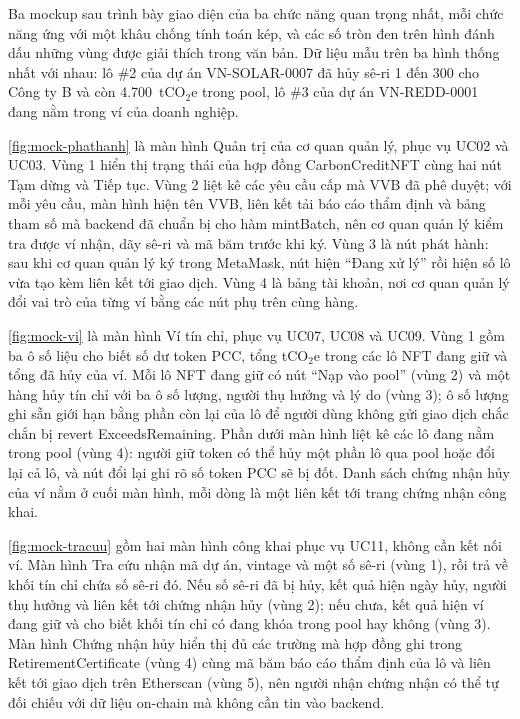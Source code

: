 Ba mockup sau trình bày giao diện của ba chức năng quan trọng nhất, mỗi chức năng ứng với một khâu chống tính toán kép, và các số tròn đen trên hình đánh dấu những vùng được giải thích trong văn bản. Dữ liệu mẫu trên ba hình thống nhất với nhau: lô \#2 của dự án VN-SOLAR-0007 đã hủy sê-ri 1 đến 300 cho Công ty B và còn 4.700~tCO$_2$e trong pool, lô \#3 của dự án VN-REDD-0001 đang nằm trong ví của doanh nghiệp.

\autoref{fig:mock-phathanh} là màn hình Quản trị của cơ quan quản lý, phục vụ UC02 và UC03. Vùng 1 hiển thị trạng thái của hợp đồng CarbonCreditNFT cùng hai nút Tạm dừng và Tiếp tục. Vùng 2 liệt kê các yêu cầu cấp mà VVB đã phê duyệt; với mỗi yêu cầu, màn hình hiện tên VVB, liên kết tải báo cáo thẩm định và bảng tham số mà backend đã chuẩn bị cho hàm mintBatch, nên cơ quan quản lý kiểm tra được ví nhận, dãy sê-ri và mã băm trước khi ký. Vùng 3 là nút phát hành: sau khi cơ quan quản lý ký trong MetaMask, nút hiện ``Đang xử lý'' rồi hiện số lô vừa tạo kèm liên kết tới giao dịch. Vùng 4 là bảng tài khoản, nơi cơ quan quản lý đổi vai trò của từng ví bằng các nút phụ trên cùng hàng.

\HinhMockPhatHanh

\autoref{fig:mock-vi} là màn hình Ví tín chỉ, phục vụ UC07, UC08 và UC09. Vùng 1 gồm ba ô số liệu cho biết số dư token PCC, tổng tCO$_2$e trong các lô NFT đang giữ và tổng đã hủy của ví. Mỗi lô NFT đang giữ có nút ``Nạp vào pool'' (vùng 2) và một hàng hủy tín chỉ với ba ô số lượng, người thụ hưởng và lý do (vùng 3); ô số lượng ghi sẵn giới hạn bằng phần còn lại của lô để người dùng không gửi giao dịch chắc chắn bị revert ExceedsRemaining. Phần dưới màn hình liệt kê các lô đang nằm trong pool (vùng 4): người giữ token có thể hủy một phần lô qua pool hoặc đổi lại cả lô, và nút đổi lại ghi rõ số token PCC sẽ bị đốt. Danh sách chứng nhận hủy của ví nằm ở cuối màn hình, mỗi dòng là một liên kết tới trang chứng nhận công khai.

\HinhMockVi

\autoref{fig:mock-tracuu} gồm hai màn hình công khai phục vụ UC11, không cần kết nối ví. Màn hình Tra cứu nhận mã dự án, vintage và một số sê-ri (vùng 1), rồi trả về khối tín chỉ chứa số sê-ri đó. Nếu số sê-ri đã bị hủy, kết quả hiện ngày hủy, người thụ hưởng và liên kết tới chứng nhận hủy (vùng 2); nếu chưa, kết quả hiện ví đang giữ và cho biết khối tín chỉ có đang khóa trong pool hay không (vùng 3). Màn hình Chứng nhận hủy hiển thị đủ các trường mà hợp đồng ghi trong RetirementCertificate (vùng 4) cùng mã băm báo cáo thẩm định của lô và liên kết tới giao dịch trên Etherscan (vùng 5), nên người nhận chứng nhận có thể tự đối chiếu với dữ liệu on-chain mà không cần tin vào backend.

